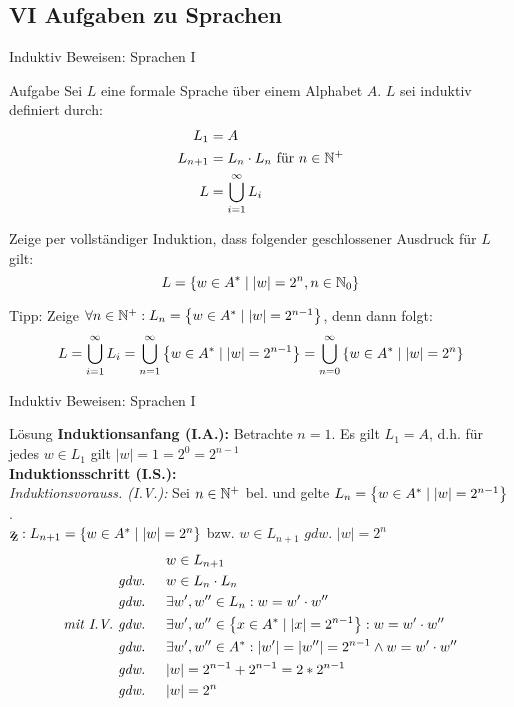 \subsection{VI Aufgaben zu Sprachen}

\begin{frame}{Induktiv Beweisen: Sprachen I}
	\small \begin{exampleblock}{Aufgabe}
		Sei $L$ eine formale Sprache über einem Alphabet $A$. $L$ sei induktiv definiert durch:
		\begin{align*}
		 	L_1 &= A \\
		 	L_{n+1} &= L_n \cdot L_n \text{ für } n\in \mathbb{N}^+ \\
		 	L &= \bigcup_{i=1}^\infty L_i
		 \end{align*}

		 \smallskip
		 Zeige per vollständiger Induktion, dass folgender geschlossener Ausdruck für $L$ gilt: \[L = \left\{ w\in A^\ast \mid |w|=2^n, n\in \mathbb{N}_0 \right\}\]
		 
	\end{exampleblock}

	\smallskip
	Tipp: Zeige $\forall n\in \mathbb{N}^+: L_n = \left\{ w\in A^\ast \mid |w|=2^{n-1} \right\}$, denn dann folgt:
	\[
		L = \bigcup_{i=1}^\infty L_i 
		= \bigcup_{n=1}^\infty \left\{ w\in A^\ast \mid |w|=2^{n-1} \right\} 
		= \bigcup_{n=0}^\infty \left\{ w\in A^\ast \mid |w|=2^{n} \right\}
	\]

\end{frame}
	
\begin{frame}{Induktiv Beweisen: Sprachen I}

	\small \begin{block}{Lösung}
		\textbf{Induktionsanfang (I.A.):} Betrachte $n=1$. Es gilt $L_1 = A$, d.h. für jedes $w \in L_1$ gilt $|w|=1=2^0=2^{n-1}$ \checkmark\\
		\textbf{Induktionsschritt (I.S.):}\\
		\textit{Induktionsvorauss. (I.V.):} Sei $n \in \mathbb{N}^+$ bel. und gelte $L_n = \left\{ w\in A^\ast \mid |w|=2^{n-1} \right\}$.\\[.25em]
		$\zz L_{n+1} = \setc{w\in A^\ast}{|w|=2^{n}}$ \quad bzw. \quad $w\in L_{n+1} \textit{ gdw. } |w|=2^n$		
		\begin{align*}
			&w\in L_{n+1} \\
			\textit{gdw. \quad}& w \in L_n \cdot L_n\\
			\textit{gdw. \quad}& \exists w',w'' \in L_n: w = w' \cdot w'' \\
			\textit{mit I.V. gdw. \quad}& \exists w',w'' \in \left\{ x\in A^\ast \mid |x|=2^{n-1} \right\}: w = w' \cdot w'' \\
			\textit{gdw. \quad}& \exists w',w'' \in A^\ast: |w'|=|w''|=2^{n-1} \wedge w = w' \cdot w''\\
			\textit{gdw. \quad}& |w|=2^{n-1}+2^{n-1}=2*2^{n-1}\\
			\textit{gdw. \quad}& |w|=2^n
		\end{align*}
	\end{block}
\end{frame}